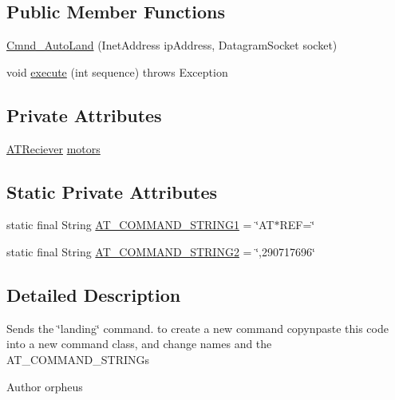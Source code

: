 \subsection*{Public Member Functions}
\begin{DoxyCompactItemize}
\item 
\hyperlink{class_drone_1_1_drone_commands_1_1_cmnd___auto_land_a189dfff825e57c361d0b586a4e219d4e}{Cmnd\+\_\+\+Auto\+Land} (Inet\+Address ip\+Address, Datagram\+Socket socket)
\item 
void \hyperlink{class_drone_1_1_drone_commands_1_1_cmnd___auto_land_a1ecb7e3e22b76695af970b00fb043fb2}{execute} (int sequence)  throws Exception  	
\end{DoxyCompactItemize}
\subsection*{Private Attributes}
\begin{DoxyCompactItemize}
\item 
\hyperlink{class_drone_1_1_hardware_1_1_a_t_reciever}{A\+T\+Reciever} \hyperlink{class_drone_1_1_drone_commands_1_1_cmnd___auto_land_a7694502dadfec8e051a5cbc3cb868883}{motors}
\end{DoxyCompactItemize}
\subsection*{Static Private Attributes}
\begin{DoxyCompactItemize}
\item 
static final String \hyperlink{class_drone_1_1_drone_commands_1_1_cmnd___auto_land_a6d1c12fcd624deeb0f3b45139a56deb8}{A\+T\+\_\+\+C\+O\+M\+M\+A\+N\+D\+\_\+\+S\+T\+R\+I\+N\+G1} = \char`\"{}A\+T$\ast$R\+E\+F=\char`\"{}
\item 
static final String \hyperlink{class_drone_1_1_drone_commands_1_1_cmnd___auto_land_a7394c73617e1182000d9a9737ae92164}{A\+T\+\_\+\+C\+O\+M\+M\+A\+N\+D\+\_\+\+S\+T\+R\+I\+N\+G2} = \char`\"{},290717696\char`\"{}
\end{DoxyCompactItemize}


\subsection{Detailed Description}
Sends the \char`\"{}landing\char`\"{} command. to create a new command copy\textquotesingle{}n\textquotesingle{}paste this code into a new command class, and change names and the A\+T\+\_\+\+C\+O\+M\+M\+A\+N\+D\+\_\+\+S\+T\+R\+I\+N\+G\textquotesingle{}s \begin{DoxyAuthor}{Author}
orpheus 
\end{DoxyAuthor}


